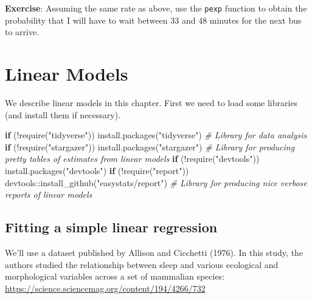 \documentclass[
]{book}
\newenvironment{Shaded}{\begin{snugshade}}{\end{snugshade}}
\newcommand{\CommentTok}[1]{\textcolor[rgb]{0.56,0.35,0.01}{\textit{#1}}}
\newcommand{\ControlFlowTok}[1]{\textcolor[rgb]{0.13,0.29,0.53}{\textbf{#1}}}
\newcommand{\FunctionTok}[1]{\textcolor[rgb]{0.00,0.00,0.00}{#1}}
\newcommand{\NormalTok}[1]{#1}
\newcommand{\SpecialCharTok}[1]{\textcolor[rgb]{0.00,0.00,0.00}{#1}}
\newcommand{\StringTok}[1]{\textcolor[rgb]{0.31,0.60,0.02}{#1}}
\begin{document}
\textbf{Exercise}: Assuming the same rate as above, use the \texttt{pexp} function to obtain the probability that I will have to wait between 33 and 48 minutes for the next bus to arrive.

\hypertarget{linear-models}{%
\chapter{Linear Models}\label{linear-models}}

We describe linear models in this chapter. First we need to load some libraries (and install them if necessary).

\begin{Shaded}
\begin{Highlighting}[]
\ControlFlowTok{if}\NormalTok{ (}\SpecialCharTok{!}\FunctionTok{require}\NormalTok{(}\StringTok{"tidyverse"}\NormalTok{)) }\FunctionTok{install.packages}\NormalTok{(}\StringTok{"tidyverse"}\NormalTok{) }\CommentTok{\# Library for data analysis}
\ControlFlowTok{if}\NormalTok{ (}\SpecialCharTok{!}\FunctionTok{require}\NormalTok{(}\StringTok{"stargazer"}\NormalTok{)) }\FunctionTok{install.packages}\NormalTok{(}\StringTok{"stargazer"}\NormalTok{) }\CommentTok{\# Library for producing pretty tables of estimates from linear models}
\ControlFlowTok{if}\NormalTok{ (}\SpecialCharTok{!}\FunctionTok{require}\NormalTok{(}\StringTok{"devtools"}\NormalTok{)) }\FunctionTok{install.packages}\NormalTok{(}\StringTok{"devtools"}\NormalTok{)}
\ControlFlowTok{if}\NormalTok{ (}\SpecialCharTok{!}\FunctionTok{require}\NormalTok{(}\StringTok{"report"}\NormalTok{)) devtools}\SpecialCharTok{::}\FunctionTok{install\_github}\NormalTok{(}\StringTok{"easystats/report"}\NormalTok{) }\CommentTok{\# Library for producing nice verbose reports of linear models}
\end{Highlighting}
\end{Shaded}

\hypertarget{fitting-a-simple-linear-regression}{%
\section{Fitting a simple linear regression}\label{fitting-a-simple-linear-regression}}

We'll use a dataset published by Allison and Cicchetti (1976). In this study, the authors studied the relationship between sleep and various ecological and morphological variables across a set of mammalian species:
\url{https://science.sciencemag.org/content/194/4266/732}
\end{document}
